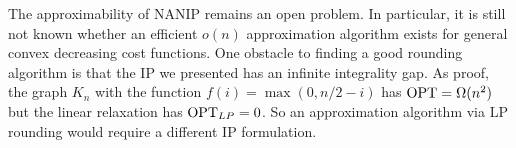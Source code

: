 \documentclass[english]{llncs}
\begin{document}
The approximability of NANIP remains an open problem. In particular, it is
still not known whether an efficient $o(n)$ approximation algorithm exists for
general convex decreasing cost functions. One obstacle to finding a good
rounding algorithm is that the IP we presented has an infinite integrality gap.
As proof, the graph $K_n$ with the function $f(i) = \max(0, n/2 - i)$ has
$\textup{OPT} = \Omega(n^2)$ but the linear relaxation has $\textup{OPT}_{LP} =
0$. So an approximation algorithm via LP rounding would require a different IP
formulation.




\end{document}
